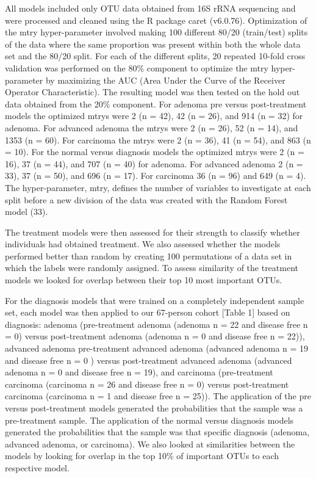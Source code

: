 \documentclass[12pt,]{article}
\begin{document}
All models included only OTU data obtained from 16S rRNA sequencing and
were processed and cleaned using the R package caret (v6.0.76).
Optimization of the mtry hyper-parameter involved making 100 different
80/20 (train/test) splits of the data where the same proportion was
present within both the whole data set and the 80/20 split. For each of
the different splits, 20 repeated 10-fold cross validation was performed
on the 80\% component to optimize the mtry hyper-parameter by maximizing
the AUC (Area Under the Curve of the Receiver Operator Characteristic).
The resulting model was then tested on the hold out data obtained from
the 20\% component. For adenoma pre versus post-treatment models the
optimized mtrys were 2 (n = 42), 42 (n = 26), and 914 (n = 32) for
adenoma. For advanced adenoma the mtrys were 2 (n = 26), 52 (n = 14),
and 1353 (n = 60). For carcinoma the mtrys were 2 (n = 36), 41 (n = 54),
and 863 (n = 10). For the normal versus diagnosis models the optimized
mtrys were 2 (n = 16), 37 (n = 44), and 707 (n = 40) for adenoma. For
advanced adenoma 2 (n = 33), 37 (n = 50), and 696 (n = 17). For
carcinoma 36 (n = 96) and 649 (n = 4). The hyper-parameter, mtry,
defines the number of variables to investigate at each split before a
new division of the data was created with the Random Forest model (33).

The treatment models were then assessed for their strength to classify
whether individuals had obtained treatment. We also assessed whether the
models performed better than random by creating 100 permutations of a
data set in which the labels were randomly assigned. To assess
similarity of the treatment models we looked for overlap between their
top 10 most important OTUs.

For the diagnosis models that were trained on a completely independent
sample set, each model was then applied to our 67-person cohort {[}Table
1{]} based on diagnosis: adenoma (pre-treatment adenoma (adenoma n = 22
and disease free n = 0) versus post-treatment adenoma (adenoma n = 0 and
disease free n = 22)), advanced adenoma pre-treatment advanced adenoma
(advanced adenoma n = 19 and disease free n = 0 ) versus post-treatment
advanced adenoma (advanced adenoma n = 0 and disease free n = 19), and
carcinoma (pre-treatment carcinoma (carcinoma n = 26 and disease free n
= 0) versus post-treatment carcinoma (carcinoma n = 1 and disease free n
= 25)). The application of the pre versus post-treatment models
generated the probabilities that the sample was a pre-treatment sample.
The application of the normal versus diagnosis models generated the
probabilities that the sample was that specific diagnosis (adenoma,
advanced adenoma, or carcinoma). We also looked at similarities between
the models by looking for overlap in the top 10\% of important OTUs to
each respective model.
\end{document}
